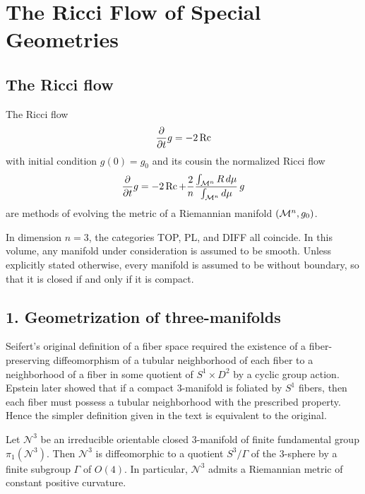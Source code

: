 \chapter{The Ricci Flow of Special Geometries}

\section*{The Ricci flow}

The Ricci flow
\[
\frac{\partial}{\partial t} g = -2 \operatorname{Rc}
\]
with initial condition $g(0)=g_0$ and its cousin the normalized Ricci flow
\[
\frac{\partial}{\partial t} g
= -2 \operatorname{Rc} + \frac{2}{n}\frac{\int_{\mathcal{M}^n} R\, d\mu}{\int_{\mathcal{M}^n} d\mu}\, g
\]
are methods of evolving the metric of a Riemannian manifold $(\mathcal{M}^n,g_0)$.

\begin{remark}
\label{ch01-rem-manifolds-smooth-boundaryless}
In dimension $n=3$, the categories TOP, PL, and DIFF all coincide. In this volume, any manifold under consideration is assumed to be smooth. Unless explicitly stated otherwise, every manifold is assumed to be without boundary, so that it is closed if and only if it is compact.
\end{remark}

\section*{1. Geometrization of three-manifolds}

\begin{remark}
\label{ch01-rem-seifert-equivalence}
Seifert's original definition of a fiber space required the existence of a fiber-preserving diffeomorphism of a tubular neighborhood of each fiber to a neighborhood of a fiber in some quotient of $S^1 \times D^2$ by a cyclic group action. Epstein later showed that if a compact $3$-manifold is foliated by $S^1$ fibers, then each fiber must possess a tubular neighborhood with the prescribed property. Hence the simpler definition given in the text is equivalent to the original.
\end{remark}

\begin{conjecture}
\label{ch01-conj-elliptization}
Let $\mathcal{N}^3$ be an irreducible orientable closed $3$-manifold of finite fundamental group $\pi_1(\mathcal{N}^3)$. Then $\mathcal{N}^3$ is diffeomorphic to a quotient $S^3/\Gamma$ of the $3$-sphere by a finite subgroup $\Gamma$ of $O(4)$. In particular, $\mathcal{N}^3$ admits a Riemannian metric of constant positive curvature.
\end{conjecture}

